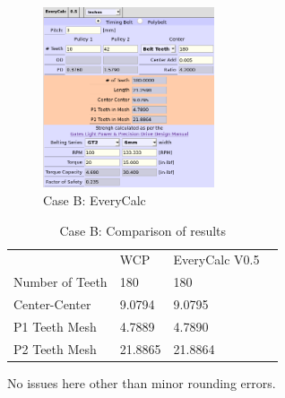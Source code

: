 \documentclass[10pt,letterpaper]{article}
\begin{document}
	\begin{figure}[H]
		\includegraphics[width=0.45\textwidth]{validation/belts_EC_B.png}
		\caption{Case B: EveryCalc}
	\end{figure}

	\begin{table}[H]
	\begin{tabular}{llll}
	                 & WCP     & EveryCalc V0.5 \\ \cline{1-3} 
	 Number of Teeth & 180     & 180      \\
	 Center-Center   & 9.0794  & 9.0795  \\
	 P1 Teeth Mesh   & 4.7889  & 4.7890 \\
	 P2 Teeth Mesh   & 21.8865 & 21.8864 
	\end{tabular}
	\caption{Case B: Comparison of results}
	\end{table}

	No issues here other than minor rounding errors.
	
\end{document}
